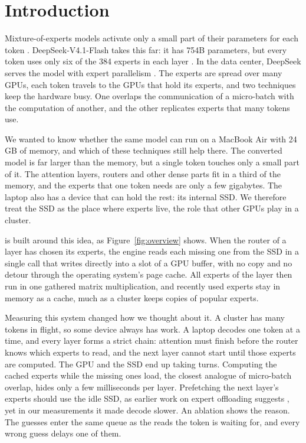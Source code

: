 \section{Introduction}
Mixture-of-experts models activate only a small part of their parameters for each token \citep{switch,deepseekv3}. DeepSeek-V4.1-Flash takes this far: it has 754B parameters, but every token uses only six of the 384 experts in each layer \citep{deepseek41flash}. In the data center, DeepSeek serves the model with expert parallelism \citep{deepinfer}. The experts are spread over many GPUs, each token travels to the GPUs that hold its experts, and two techniques keep the hardware busy. One overlaps the communication of a micro-batch with the computation of another, and the other replicates experts that many tokens use.

We wanted to know whether the same model can run on a MacBook Air with 24\,GB of memory, and which of these techniques still help there. The converted model is far larger than the memory, but a single token touches only a small part of it. The attention layers, routers and other dense parts fit in a third of the memory, and the experts that one token needs are only a few gigabytes. The laptop also has a device that can hold the rest: its internal SSD. We therefore treat the SSD as the place where experts live, the role that other GPUs play in a cluster.

\method{} is built around this idea, as Figure~\ref{fig:overview} shows. When the router of a layer has chosen its experts, the engine reads each missing one from the SSD in a single call that writes directly into a slot of a GPU buffer, with no copy and no detour through the operating system's page cache. All experts of the layer then run in one gathered matrix multiplication, and recently used experts stay in memory as a cache, much as a cluster keeps copies of popular experts.

Measuring this system changed how we thought about it. A cluster has many tokens in flight, so some device always has work. A laptop decodes one token at a time, and every layer forms a strict chain: attention must finish before the router knows which experts to read, and the next layer cannot start until those experts are computed. The GPU and the SSD end up taking turns. Computing the cached experts while the missing ones load, the closest analogue of micro-batch overlap, hides only a few milliseconds per layer. Prefetching the next layer's experts should use the idle SSD, as earlier work on expert offloading suggests \citep{moeoffload}, yet in our measurements it made decode slower. An ablation shows the reason. The guesses enter the same queue as the reads the token is waiting for, and every wrong guess delays one of them.

